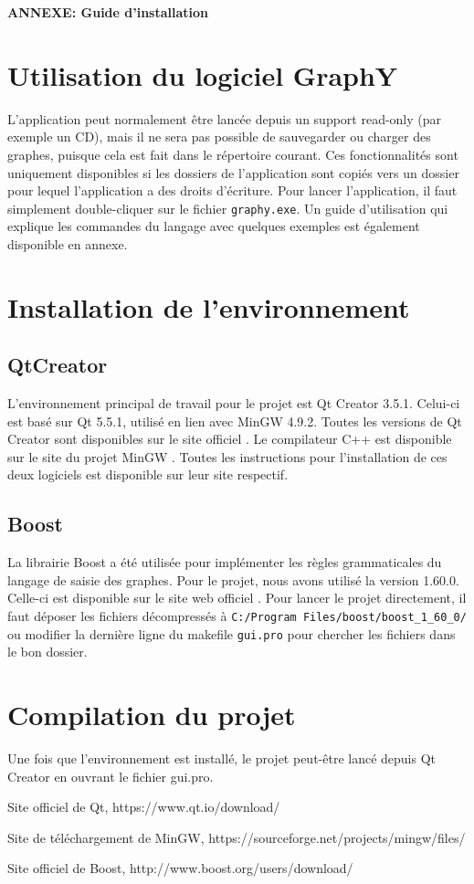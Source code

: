 \documentclass[french]{article}
\begin{document}
	\centering
	\large{\textbf{ANNEXE: Guide d'installation}}
	
	\justifying
	\normalsize
	
	\section{Utilisation du logiciel GraphY}
	L'application peut normalement être lancée depuis un support read-only (par exemple un CD), mais il ne sera pas possible de sauvegarder ou charger des graphes, puisque cela est fait dans le répertoire courant. Ces fonctionnalités sont uniquement disponibles si les dossiers de l'application sont copiés vers un dossier pour lequel l'application a des droits d'écriture. Pour lancer l'application, il faut simplement double-cliquer sur le fichier \texttt{graphy.exe}. Un guide d'utilisation qui explique les commandes du langage avec quelques exemples est également disponible en annexe.
	
	\section{Installation de l'environnement}
		\subsection{QtCreator}
		L'environnement principal de travail pour le projet est Qt Creator 3.5.1. Celui-ci est basé sur Qt 5.5.1, utilisé en lien avec MinGW 4.9.2. Toutes les versions de Qt Creator sont disponibles sur le site officiel \cite{qt}. Le compilateur C++ est disponible sur le site du projet MinGW \cite{minGW}. Toutes les instructions pour l'installation de ces deux logiciels est disponible sur leur site respectif.
	
		\subsection{Boost}
		La librairie Boost a été utilisée pour implémenter les règles grammaticales du langage de saisie des graphes. Pour le projet, nous avons utilisé la version 1.60.0. Celle-ci est disponible sur le site web officiel \cite{boost}. Pour lancer le projet directement, il faut déposer les fichiers décompressés à \texttt{C:/Program Files/boost/boost\_1\_60\_0/} ou modifier la dernière ligne du makefile \texttt{gui.pro} pour chercher les fichiers dans le bon dossier.
	
	\section{Compilation du projet}
	Une fois que l'environnement est installé, le projet peut-être lancé depuis Qt Creator en ouvrant le fichier gui.pro.
	
	\begin{thebibliography}{9}
		Site officiel de Qt, https://www.qt.io/download/
		
		Site de téléchargement de MinGW, https://sourceforge.net/projects/mingw/files/
		
		Site officiel de Boost, http://www.boost.org/users/download/
	\end{thebibliography}
	
\end{document}
